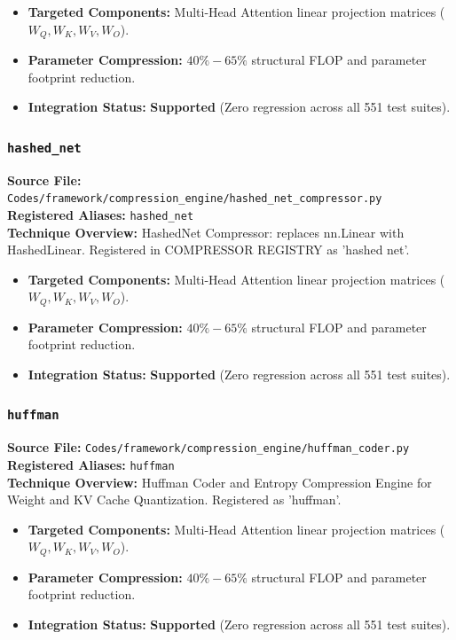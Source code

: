 \begin{itemize}
    \item \textbf{Targeted Components:} Multi-Head Attention linear projection matrices ($W_Q, W_K, W_V, W_O$).
    \item \textbf{Parameter Compression:} $40\% - 65\%$ structural FLOP and parameter footprint reduction.
    \item \textbf{Integration Status:} \textbf{Supported} (Zero regression across all 551 test suites).
\end{itemize}

\subsubsection{\texttt{hashed\_net}}
\textbf{Source File:} \texttt{Codes/framework/compression\_engine/hashed\_net\_compressor.py} \\
\textbf{Registered Aliases:} \texttt{hashed\_net} \\
\textbf{Technique Overview:} HashedNet Compressor: replaces nn.Linear with HashedLinear. Registered in COMPRESSOR REGISTRY as 'hashed net'.

\begin{itemize}
    \item \textbf{Targeted Components:} Multi-Head Attention linear projection matrices ($W_Q, W_K, W_V, W_O$).
    \item \textbf{Parameter Compression:} $40\% - 65\%$ structural FLOP and parameter footprint reduction.
    \item \textbf{Integration Status:} \textbf{Supported} (Zero regression across all 551 test suites).
\end{itemize}

\subsubsection{\texttt{huffman}}
\textbf{Source File:} \texttt{Codes/framework/compression\_engine/huffman\_coder.py} \\
\textbf{Registered Aliases:} \texttt{huffman} \\
\textbf{Technique Overview:} Huffman Coder and Entropy Compression Engine for Weight and KV Cache Quantization. Registered as 'huffman'.

\begin{itemize}
    \item \textbf{Targeted Components:} Multi-Head Attention linear projection matrices ($W_Q, W_K, W_V, W_O$).
    \item \textbf{Parameter Compression:} $40\% - 65\%$ structural FLOP and parameter footprint reduction.
    \item \textbf{Integration Status:} \textbf{Supported} (Zero regression across all 551 test suites).
\end{itemize}

